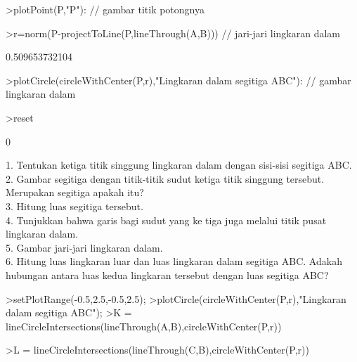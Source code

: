 \documentclass[12pt,arial,letterpaper]{book}
\begin{document}
\begin{eulernootebook}
\begin{eulercomment}
\begin{eulercomment}
\begin{eulernootebook}
\begin{eulercomment}
\begin{eulercomment}
\begin{eulercomment}
\begin{eulercomment}
\begin{eulercomment}
\begin{eulercomment}
\begin{eulernotebook}
\begin{eulercomment}
\begin{eulercomment}
\begin{eulerprompt}
>plotPoint(P,"P"): // gambar titik potongnya
\end{eulerprompt}
\begin{eulerprompt}
>r=norm(P-projectToLine(P,lineThrough(A,B))) // jari-jari lingkaran dalam
\end{eulerprompt}
\begin{euleroutput}
  0.509653732104
\end{euleroutput}
\begin{eulerprompt}
>plotCircle(circleWithCenter(P,r),"Lingkaran dalam segitiga ABC"): // gambar lingkaran dalam
\end{eulerprompt}
\begin{eulerprompt}
>reset
\end{eulerprompt}
\begin{euleroutput}
  0
\end{euleroutput}
\begin{eulercomment}
1. Tentukan ketiga titik singgung lingkaran dalam dengan sisi-sisi
segitiga ABC.\\
2. Gambar segitiga dengan titik-titik sudut ketiga titik singgung
tersebut. Merupakan segitiga apakah itu?\\
3. Hitung luas segitiga tersebut.\\
4. Tunjukkan bahwa garis bagi sudut yang ke tiga juga melalui titik
pusat lingkaran dalam.\\
5. Gambar jari-jari lingkaran dalam.\\
6. Hitung luas lingkaran luar dan luas lingkaran dalam segitiga ABC.
Adakah hubungan antara luas kedua lingkaran tersebut dengan luas
segitiga ABC?
\end{eulercomment}
\begin{eulerprompt}
>setPlotRange(-0.5,2.5,-0.5,2.5);
>plotCircle(circleWithCenter(P,r),"Lingkaran dalam segitiga ABC");
>K = lineCircleIntersections(lineThrough(A,B),circleWithCenter(P,r))
\end{eulerprompt}
\begin{euleroutput}
  [0.5,  0.5]
\end{euleroutput}
\begin{eulerprompt}
>L = lineCircleIntersections(lineThrough(C,B),circleWithCenter(P,r))

\end{eulerprompt}
\end{eulercomment}
\end{eulercomment}
\end{eulernotebook}
\end{eulercomment}
\end{eulercomment}
\end{eulercomment}
\end{eulercomment}
\end{eulercomment}
\end{eulercomment}
\end{eulernootebook}
\end{eulercomment}
\end{eulercomment}
\end{eulernootebook}
\end{document}
